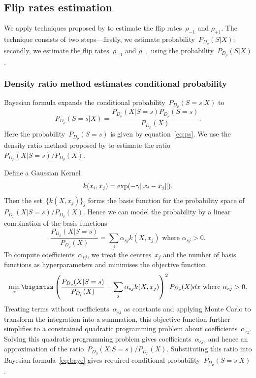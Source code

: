 \documentclass[12pt]{article} %
\DeclarePairedDelimiter{\norm}{\lVert}{\rVert}
\newcommand{\rhoo}{\rho_{+1}}
\newcommand{\rhoz}{\rho_{-1}}
\begin{document}
\subsection{Flip rates estimation}\label{method2}
We apply techniques proposed by \citet{liu2016classification} to estimate the flip rates~$\rhoz$ and $\rhoo$. The technique consists of two steps---firstly, we estimate probability~$P_{D_\rho}(S|X)$; secondly, we estimate the flip rates~$\rhoz$ and $\rhoo$ using the probability~$P_{D_\rho}(S|X)$.



\subsubsection{Density ratio method estimates conditional probability}\label{method22}
Bayesian formula expands the conditional probability~$P_{D_\rho}(S=s|X)$ to
\begin{equation}
   P_{D_\rho}(S=s|X)=\frac{P_{D_\rho}(X|S=s)P_{D_\rho}(S=s)}{P_{D_\rho}(X)}.\label{eq:baye}
\end{equation}
Here the probability~$P_{D_\rho}(S=s)$ is given by equation~\eqref{eq:ps}. We use the density ratio method proposed by \citet{DBLP:journals/jmlr/KanamoriHS09} to estimate the ratio~${P_{D_\rho}(X|S=s)}/{P_{D_\rho}(X)}$.

Define a Gaussian Kernel
\begin{equation}\label{eq:gauss}
k(x_i,x_j)=\exp(-\gamma\norm{x_i-x_j}).
\end{equation}
Then the set~$\{k(X,x_j) \}_j$ forms the basis function for the probability space of ${P_{D_\rho}(X|S=s)}/{P_{D_\rho}(X)}$. Hence we can model the probability by a linear combination of the basis functions
\begin{equation*}
   \frac{P_{D_\rho}(X|S=s)}{P_{D_\rho}(X)}=\sum_j \alpha_{sj} k(X,x_j) \text{ where }\alpha_{sj}>0.%
\end{equation*}
To compute coefficients~$\alpha_{sj}$, we treat the centres~$x_j$ and the number of basis functions as hyperparameters and minimises the objective function
\begin{equation*}
  \min_\alpha \bigintss \left(\frac{P_{D_\rho}(X|S=s)}{P_{D_\rho}(X)}-\sum_j \alpha_{sj} k(X,x_j)\right)^2P_{D_\rho}(X)dx \text{ where }\alpha_{sj}>0.
\end{equation*}
Treating terms without coefficients~$\alpha_{sj}$ as constants and applying Monte Carlo to transform the integration into a summation, this objective function further simplifies to a constrained quadratic programming problem about coefficients~$\alpha_{sj}$. Solving this quadratic programming problem gives coefficients~$\alpha_{sj}$, and hence an approximation of the ratio~${P_{D_\rho}(X|S=s)}/{P_{D_\rho}(X)}$. Substituting this ratio into Bayesian formula~\eqref{eq:baye} gives required conditional probability~$P_{D_\rho}(S=s|X)$.
\end{document}
